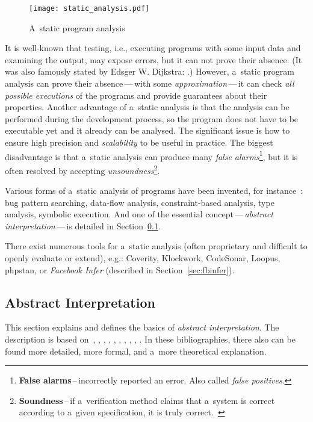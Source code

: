 \begin{figure}[hbt]
    \centering
    \texttt{[image: static\_analysis.pdf]}
    \caption{
        A~static program analysis~\cite{AIBasedFormalMethodsCousot}
    }
    \label{fig:staticAnalysis}
\end{figure}

It is well-known that testing, i.e., executing programs
with some input data and examining the output, may expose errors, but it
can not prove their absence. (It was also famously stated by Edsger W.
Dijkstra: .) However, a~static program analysis
can prove their absence\,---\,with some \emph{approximation}\,---\,it can
check \emph{all possible executions} of the programs and provide guarantees
about their properties. Another advantage of a~static analysis is that the
analysis can be performed during the development process, so the program
does not have to be executable yet and it already can be analysed.
The significant issue is how to ensure high precision and
\emph{scalability} to be useful in practice. The biggest disadvantage is
that a~static analysis can produce many \emph{false alarms}\footnote{
\textbf{False alarms}\,--\,incorrectly reported an error. Also called
\emph{false positives}.}, but it is often
resolved by accepting \emph{unsoundness}\footnote{\textbf{Soundness}\,--\,if
a~verification method claims that a~system is correct according to a~given
specification, it is truly correct.~\cite{favStaticAnalysis}}.

Various forms of a~static analysis of programs have been invented, for
instance~\cite{favStaticAnalysis}: bug pattern searching, data-flow
analysis, constraint-based analysis, type analysis, symbolic execution. And
one of the essential concept\,---\,\emph{abstract interpretation}\,---\,is
detailed in Section~\ref{sec:AI}.

There exist numerous tools for a~static analysis (often proprietary and
difficult to openly evaluate or extend), e.g.: Coverity, Klockwork, CodeSonar,
Loopus, phpstan, or \emph{Facebook Infer} (described in
Section~\ref{sec:fbinfer}).


\subsection{Abstract Interpretation}
\label{sec:AI}

This section explains and defines the basics of \emph{abstract interpretation}.
The description is based on~\cite{AIBasedFormalMethodsCousot},
\cite{AILatticeModelCousot}, \cite{AIInNutshellCousot}, \cite{AICousotWeb},
\cite{favAI}, \cite{projectPracticeMarcin2018}, \cite{wideningNarrowingCousot},
\cite{programAnalysisNielson}, \cite{staticAnalysisMoller},
\cite{favLatticesAndFixpoints}. In these bibliographies, there also can be
found more detailed, more formal, and a~more theoretical explanation.

